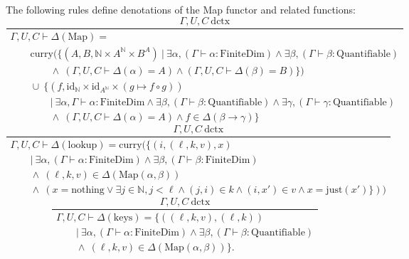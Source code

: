 \documentclass[11pt]{article}
\begin{document}
The following rules define denotations of the Map functor
and related functions:
\begin{equation}
	\frac{\Gamma,U,C\ \text{dctx}}
	{\begin{array}{l}
		\Gamma,U,C \vdash \Delta(\text{Map}) =
		\\ \qquad \text{curry}(\{(A, B, \mathbb{N} \times A^{\mathbb{N}} \times B^A)
		\ |\ \exists \alpha, (\Gamma \vdash \alpha : \text{FiniteDim})
		 \wedge \exists \beta, (\Gamma \vdash \beta : \text{Quantifiable})
		\\ \qquad\qquad \wedge\ (\Gamma,U,C \vdash \Delta(\alpha) = A)
		\wedge (\Gamma,U,C \vdash \Delta(\beta) = B)\})
		\\ \qquad \cup\ \{(f, \text{id}_{\mathbb{N}}
				\times \text{id}_{A^\mathbb{N}}
				\times (g \mapsto f \circ g))
		\\ \qquad\qquad |\ \exists \alpha, \Gamma \vdash \alpha : \text{FiniteDim}
		\wedge \exists \beta, (\Gamma \vdash \beta : \text{Quantifiable})
		\wedge \exists \gamma, (\Gamma \vdash \gamma : \text{Quantifiable})
		\\ \qquad\qquad \wedge\ (\Gamma,U,C \vdash \Delta(\alpha) = A)
		\wedge f \in \Delta(\beta \to \gamma)\}
	\end{array}}
\end{equation}
\begin{equation}
	\frac{\Gamma,U,C\ \text{dctx}}
	{\begin{array}{l}
		\Gamma,U,C \vdash \Delta(\text{lookup}) =
		\text{curry}(\{(i,(\ell,k,v),x)
		\\ \qquad |\ \exists \alpha, (\Gamma \vdash \alpha : \text{FiniteDim})
		\wedge \exists \beta, (\Gamma \vdash \beta : \text{FiniteDim})
		\\ \qquad \wedge\ (\ell,k,v) \in \Delta(\text{Map}(\alpha, \beta))
		\\ \qquad \wedge\ (x = \text{nothing} \vee \exists j \in \mathbb{N}, j < \ell \wedge
		(j,i) \in k \wedge (i,x') \in v \wedge x = \text{just}(x')\}))
	\end{array}}
\end{equation}
\begin{equation}
	\frac{\Gamma,U,C\ \text{dctx}}
	{\begin{array}{l}
		\Gamma,U,C \vdash \Delta(\text{keys})
		= \{((\ell,k,v),(\ell,k))
		\\ \qquad |\ \exists \alpha, (\Gamma \vdash \alpha : \text{FiniteDim})
		\wedge \exists \beta, (\Gamma \vdash \beta : \text{Quantifiable})
		\\ \qquad \wedge\ (\ell,k,v) \in \Delta(\text{Map}(\alpha, \beta))\}.
	\end{array}}
\end{equation}
\end{document}

